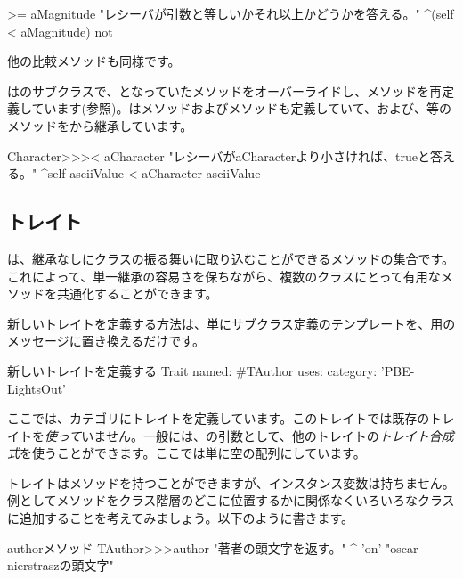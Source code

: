 \documentclass[a4paper,10pt,twoside]{book}
\begin{document}
\begin{method}[Magnitude>=]{}
>= aMagnitude 
	"レシーバが引数と等しいかそれ以上かどうかを答える。"
	^(self < aMagnitude) not
\end{method}
他の比較メソッドも同様です。

はのサブクラスで、となっていた\ct{<}メソッドをオーバーライドし、メソッドを再定義しています(参照)。は\ct{=}メソッドおよびメソッドも定義していて、\ct{>=}および\ct{<=}、\ct{~=}等のメソッドをから継承しています。

\begin{method}[CharacterLessThan]{}
Character>>>< aCharacter 
	"レシーバがaCharacterより小さければ、trueと答える。"
	^self asciiValue < aCharacter asciiValue
\end{method}

\subsection{トレイト}
は、継承なしにクラスの振る舞いに取り込むことができるメソッドの集合です。これによって、単一継承の容易さを保ちながら、複数のクラスにとって有用なメソッドを共通化することができます。

新しいトレイトを定義する方法は、単にサブクラス定義のテンプレートを、用のメッセージに置き換えるだけです。

\begin{classdef}[tauthor]{新しいトレイトを定義する}
Trait named: #TAuthor
	uses: { }
	category: 'PBE-LightsOut'
\end{classdef}

\noindent
ここでは、カテゴリにトレイトを定義しています。このトレイトでは既存のトレイトを\emph{使って}いません。一般には、の引数として、他のトレイトの\emph{トレイト合成式}を使うことができます。ここでは単に空の配列にしています。

トレイトはメソッドを持つことができますが、インスタンス変数は持ちません。例としてメソッドをクラス階層のどこに位置するかに関係なくいろいろなクラスに追加することを考えてみましょう。以下のように書きます。

\begin{method}[author]{authorメソッド}
TAuthor>>>author
    "著者の頭文字を返す。"
	^ 'on'    "oscar nierstraszの頭文字"
\end{method}
\end{document}
